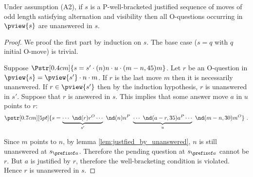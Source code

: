 \begin{lemma}
\label{lem:oq_in_pview_unanswered}
Under assumption (A2), if $s$ is a P-well-bracketed justified sequence of moves of odd length satisfying alternation and visibility then  all O-questions occurring in $\pview{s}$ are unanswered in $s$.
\end{lemma}
\begin{proof}
We proof the first part by induction on $s$.
The base case ($s = q$ with $q$ initial O-move) is trivial.

Suppose $\Pstr[0.4cm]{ s = s' \cdot (n)n \cdot u \cdot (m-n,45){m} }$.
Let $r$ be an O-question in $\pview{s} = \pview{s'} \cdot n \cdot m$.
If $r$ is the last move $m$ then it is necessarily unanswered.
If $r \in \pview{s'}$ then by the induction hypothesis, $r$ is unanswered in $s'$.
Suppose that $r$ is answered in $s$. This implies that some answer move $a$ in $u$ points to $r$:
$$\pstr[0.7cm][5pt]{ s = \underbrace{\cdots\ \nd(r){r}^O \cdots }_{s'} \
\nd(n){n}^P \ \underbrace{\cdots\ \nd(a-r,35){a}^P \cdots }_{u} \
\nd(m-n,30){m}^O } \ .$$

Since $m$ points to $n$, by lemma \ref{lem:justfied_by_unanswered}, $n$ is still unanswered at $s_{\prefixof a}$. Therefore the pending
question at $s_{\prefixof a}$ cannot be $r$. But $a$ is justified by $r$, therefore the well-bracketing condition is violated. Hence $r$ is
unanswered in $s$.
\end{proof}





